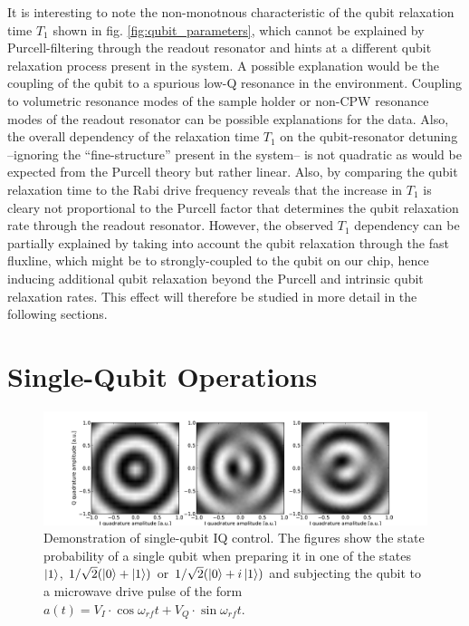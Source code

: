 It is interesting to note the non-monotnous characteristic of the qubit relaxation time $T_1$ shown in fig. \ref{fig:qubit_parameters}, which cannot be explained by Purcell-filtering through the readout resonator and hints at a different qubit relaxation process present in the system. A possible explanation would be the coupling of the qubit to a spurious low-Q resonance in the environment. Coupling to volumetric resonance modes of the sample holder or non-CPW resonance modes of the readout resonator can be possible explanations for the data. Also, the overall dependency of the relaxation time $T_1$ on the qubit-resonator detuning --ignoring the ``fine-structure'' present in the system-- is not quadratic as would be expected from the Purcell theory but rather linear. Also, by comparing the qubit relaxation time to the Rabi drive frequency reveals that the increase in $T_1$ is cleary not proportional to the Purcell factor that determines the qubit relaxation rate through the readout resonator. However, the observed $T_1$ dependency can be partially explained by taking into account the qubit relaxation through the fast fluxline, which might be to strongly-coupled to the qubit on our chip, hence inducing additional qubit relaxation beyond the Purcell and intrinsic qubit relaxation rates. This effect will therefore be studied in more detail in the following sections.

\section{Single-Qubit Operations}

\begin{figure}[ht!]
	\centering
		\includegraphics[width=1.\textwidth]{"./data/ct5/2010_12_01 - iq tomography/iq_tomographies"}
	\caption[Demonstration of single-qubit IQ control]{Demonstration of single-qubit IQ control. The figures show the state probability of a single qubit when preparing it in one of the states $\left| 1 \right>$, $1/\sqrt{2}(\left| 0 \right>+\left| 1 \right>)$ or $1/\sqrt{2}(\left| 0 \right>+i\left| 1 \right>)$ and subjecting the qubit to a microwave drive pulse of the form $a(t) = V_I\cdot\cos{\omega_{rf}t}+V_Q\cdot\sin{\omega_{rf}t}$.}
	\label{fig:single_qubit_iq_control}
\end{figure}

